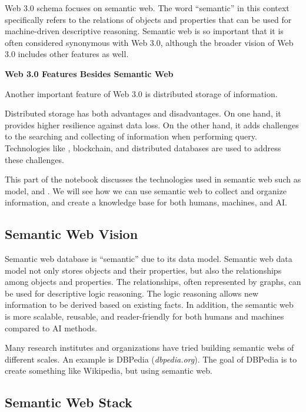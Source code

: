 Web 3.0 schema focuses on semantic web. The word ``semantic'' in this context specifically refers to the relations of objects and properties that can be used for machine-driven descriptive reasoning. Semantic web is so important that it is often considered synonymous with Web 3.0, although the broader vision of Web 3.0 includes other features as well.

\begin{mdframed}
\noindent \textbf{Web 3.0 Features Besides Semantic Web}

Another important feature of Web 3.0 is distributed storage of information. 

Distributed storage has both advantages and disadvantages. On one hand, it provides higher resilience against data loss. On the other hand, it adds challenges to the searching and collecting of information when performing query. Technologies like , blockchain, and distributed databases are used to address these challenges.

\end{mdframed}

This part of the notebook discusses the technologies used in semantic web such as  model,  and . We will see how we can use semantic web to collect and organize information, and create a knowledge base for both humans, machines, and AI.

\subsection{Semantic Web Vision}

Semantic web database is ``semantic'' due to its data model. Semantic web data model not only stores objects and their properties, but also the relationships among objects and properties. The relationships, often represented by graphs, can be used for descriptive logic reasoning. The logic reasoning allows new information to be derived based on existing facts. In addition, the semantic web is more scalable, reusable, and reader-friendly for both humans and machines compared to AI methods.

Many research institutes and organizations have tried building semantic webs of different scales. An example is DBPedia (\textit{dbpedia.org}). The goal of DBPedia is to create something like Wikipedia, but using semantic web.

\subsection{Semantic Web Stack} \label{subsec:semanticwebstack}

